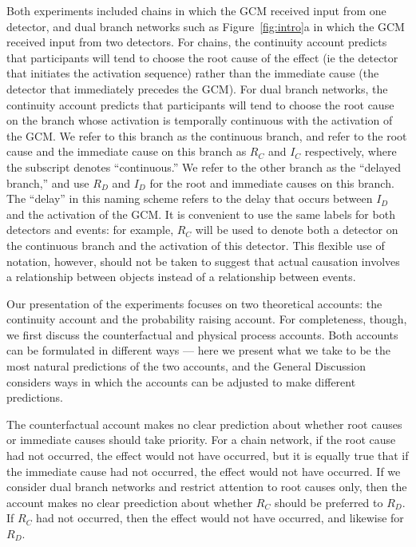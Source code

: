 \documentclass[10pt,letterpaper]{article}
\newcommand{\ev}[2]{$#1_#2$}
\begin{document}
Both experiments included chains in which the GCM received input from one detector, and dual branch networks such as Figure~\ref{fig:intro}a in which the GCM received input from two detectors. For chains, the continuity account predicts that participants will tend to choose the root cause of the effect (ie the detector that initiates the activation sequence) rather than the immediate cause (the detector that immediately precedes the GCM). For dual branch networks, the continuity account predicts that participants will tend to choose the root cause on the branch whose activation is temporally continuous with the activation of the GCM. We refer to this branch as the continuous branch, and refer to the root cause and the immediate cause on this branch as \ev{R}{C} and \ev{I}{C} respectively, where the subscript denotes ``continuous.'' We refer to the other branch as the ``delayed branch,'' and use \ev{R}{D} and \ev{I}{D} for the root and immediate causes on this branch. The ``delay'' in this naming scheme refers to the delay that occurs between \ev{I}{D} and the activation of the GCM. It is convenient to use the same labels for both detectors and events: for example, \ev{R}{C} will be used to denote both a detector on the continuous branch and the activation of this detector. This flexible use of notation, however, should not be taken to suggest that actual causation involves a relationship between objects instead of a relationship between events.

Our presentation of the experiments focuses on two theoretical accounts: the continuity account and the probability raising account. For completeness, though, we first discuss the counterfactual and physical process accounts. Both accounts can be formulated in different ways --- here we present what we take to be the most natural predictions of the two accounts, and the General Discussion considers ways in which the accounts can be adjusted to make different predictions. 

The counterfactual account makes no clear prediction about whether root causes or immediate causes should take priority. For a chain network, if the root cause had not occurred, the effect would not have occurred, but it is equally true that if the immediate cause had not occurred, the effect would not have occurred. If we consider dual branch networks and restrict attention to root causes only, then the account makes no clear preediction about whether \ev{R}{C} should be preferred to \ev{R}{D}.  If \ev{R}{C} had not occurred, then the effect would not have occurred, and likewise for \ev{R}{D}.  
\end{document}
